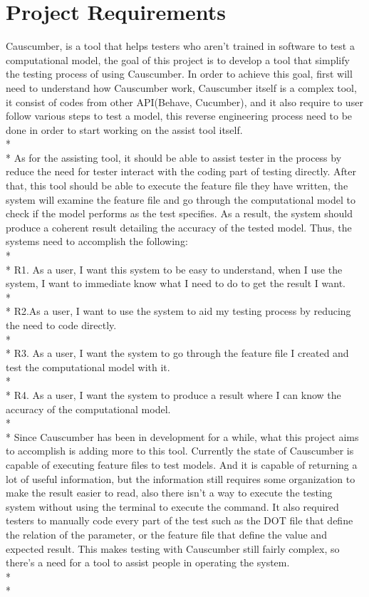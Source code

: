 \section{Project Requirements}
Causcumber, is a tool that helps testers who aren’t trained in software to test a computational model, the goal of this project is to develop a tool that simplify the testing process of using Causcumber. In order to achieve this goal, first will need to understand how Causcumber work, Causcumber itself is a complex tool, it consist of codes from other API(Behave, Cucumber), and it also require to user follow various steps to test a model, this reverse engineering process need to be done in order to start working on the assist tool itself.\\*\\*
As for the assisting tool, it should be able to assist tester in the process by reduce the need for tester interact with the coding part of testing directly. After that, this tool should be able to execute the feature file they have written, the system will examine the feature file and go through the computational model to check if the model performs as the test specifies. As a result, the system should produce a coherent result detailing the accuracy of the tested model. Thus, the systems need to accomplish the following:\\*
\\*
R1. As a user, I want this system to be easy to understand, when I use the system, I want to immediate know what I need to do to get the result I want.\\*
\\*
R2.As a user, I want to use the system to aid my testing process by reducing the need to code directly. \\*
\\*
R3. As a user, I want the system to go through the feature file I created and test the computational model with it.\\*
\\*
R4. As a user, I want the system to produce a result where I can know the accuracy of the computational model.\\*
\\*
Since Causcumber has been in development for a while, what this project aims to accomplish is adding more to this tool. Currently the state of Causcumber is capable of executing feature files to test models. And it is capable of returning a lot of useful information, but the information still requires some organization to make the result easier to read, also there isn’t a way to execute the testing system without using the terminal to execute the command. It also required testers to manually code every part of the test such as the DOT file that define the relation of the parameter, or the feature file that define the value and expected result. This makes testing with Causcumber still fairly complex, so there’s a need for a tool to assist people in operating the system. \\*\\*
